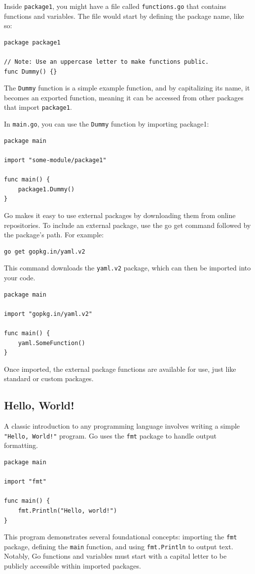 Inside \texttt{package1}, you might have a file called \texttt{functions.go} that contains functions and variables. The file would start by defining the package name, like so:
\begin{verbatim}
package package1

// Note: Use an uppercase letter to make functions public.
func Dummy() {}
\end{verbatim}
The \texttt{Dummy} function is a simple example function, and by capitalizing its name, it becomes an exported function, meaning it can be accessed from other packages that import \texttt{package1}.

In \texttt{main.go}, you can use the \texttt{Dummy} function by importing package1:
\begin{verbatim}
package main

import "some-module/package1"

func main() {
    package1.Dummy()
}
\end{verbatim}
Go makes it easy to use external packages by downloading them from online repositories. To include an external package, use the go get command followed by the package’s path. For example:

\begin{verbatim}
go get gopkg.in/yaml.v2
\end{verbatim}
This command downloads the \texttt{yaml.v2} package, which can then be imported into your code.

\begin{verbatim}
package main

import "gopkg.in/yaml.v2"

func main() {
    yaml.SomeFunction()
}
\end{verbatim}
Once imported, the external package functions are available for use, just like standard or custom packages.

\subsection*{Hello, World!}
A classic introduction to any programming language involves writing a simple \texttt{"Hello, World!"} program. Go uses the \texttt{fmt} package to handle output formatting.

\begin{verbatim}
package main

import "fmt"

func main() {
    fmt.Println("Hello, world!")
}
\end{verbatim}
This program demonstrates several foundational concepts: importing the \texttt{fmt} package, defining the \texttt{main} function, and using \texttt{fmt.Println} to output text. Notably, Go functions and variables must start with a capital letter to be publicly accessible within imported packages.

